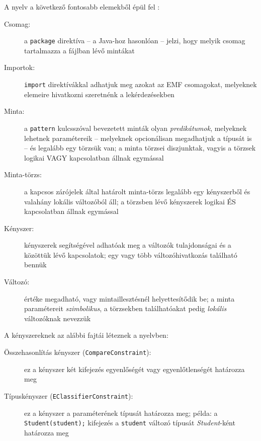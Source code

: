 A nyelv a következő fontosabb elemekből épül fel \cite{EclipseOrgIncQueryLang}:
\begin{description}
\item[Csomag:] a \texttt{package} direktíva -- a Java-hoz hasonlóan -- jelzi, hogy melyik csomag tartalmazza a fájlban lévő mintákat
\item[Importok:] \texttt{import} direktívákkal adhatjuk meg azokat az EMF csomagokat, melyeknek elemeire hivatkozni szeretnénk a lekérdezésekben
\item[Minta:] a \texttt{pattern} kulcsszóval bevezetett minták olyan \emph{predikátumok}, melyeknek lehetnek paramétereik -- melyeknek opcionálisan megadhatjuk a típusát is -- és legalább egy törzsük van; a minta törzsei diszjunktak, vagyis a törzsek logikai VAGY kapcsolatban állnak egymással
\item[Minta-törzs:] a kapcsos zárójelek által határolt minta-törzs legalább egy kényszerből és valahány lokális változóból áll; a törzsben lévő kényszerek logikai ÉS kapcsolatban állnak egymással 
\item[Kényszer:] kényszerek segítségével adhatóak meg a változók tulajdonságai és a közöttük lévő kapcsolatok; egy vagy több változóhivatkozás található bennük
\item[Változó:] értéke megadható, vagy mintaillesztésnél helyettesítődik be; a minta paramétereit \emph{szimbolikus}, a törzsekben találhatóakat pedig \emph{lokális} változóknak nevezzük
\end{description}

A kényszereknek az alábbi fajtái léteznek a nyelvben:
\begin{description}
\item[Összehasonlítás kényszer (\texttt{CompareConstraint}):] ez a kényszer két kifejezés egyenlőségét vagy egyenlőtlenségét határozza meg
\item[Típuskényszer (\texttt{EClassifierConstraint}):] ez a kényszer a paraméterének típusát határozza meg; példa: a \texttt{Student(student);} kifejezés a \texttt{student} változó típusát \textit{Student}-ként határozza meg
\end{description}
